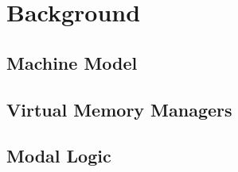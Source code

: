 \section{Background}
\label{sec:background}
\subsection{Machine Model}
\label{sec:backgroundonmachinemodel}
\subsection{Virtual Memory Managers}
\label{sec:backgroundonvmm}
\subsection{Modal Logic}
\label{sec:backgroundonmodallogic}
